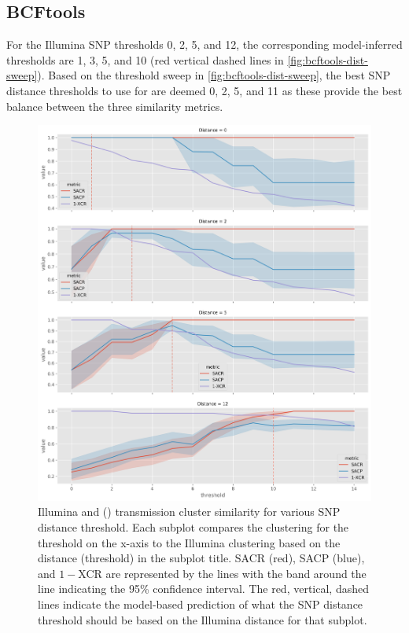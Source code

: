\subsection{BCFtools}

For the Illumina SNP thresholds 0, 2, 5, and 12, the corresponding \bcftools{} model-inferred thresholds are 1, 3, 5, and 10 (red vertical dashed lines in \autoref{fig:bcftools-dist-sweep}). Based on the threshold sweep in \autoref{fig:bcftools-dist-sweep}, the best SNP distance thresholds to use for \bcftools{} are deemed 0, 2, 5, and 11 as these provide the best balance between the three similarity metrics.

\begin{figure}
\begin{center}
\includegraphics[width=0.90\columnwidth]{Appendix1/Figs/bcftools-threshold-sweep.png}
\caption{{Illumina and \ont{} (\bcftools{}) transmission cluster similarity for various SNP distance threshold. Each subplot compares the \ont{} clustering for the threshold on the x-axis to the Illumina clustering based on the distance (threshold) in the subplot title. SACR (red), SACP (blue), and $1-$XCR are represented by the lines with the band around the line indicating the 95\% confidence interval. The red, vertical, dashed lines indicate the model-based prediction of what the \ont{} SNP distance threshold should be based on the Illumina distance for that subplot.
{\label{fig:bcftools-dist-sweep}}%
}}
\end{center}
\end{figure}

